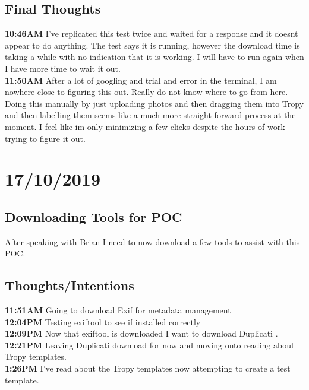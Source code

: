 \documentclass{article}
\begin{document}
\subsection{Final Thoughts}
\textbf{10:46AM} I've replicated this test twice and waited for a response and it doesnt appear to do anything. The test says it is running, however the download time is taking a while with no indication that it is working. I will have to run again when I have more time to wait it out. \\

\textbf{11:50AM} After a lot of googling and trial and error in the terminal, I am nowhere close to figuring this out. Really do not know where to go from here. Doing this manually by just uploading photos and then dragging them into Tropy and then labelling them seems like a much more straight forward process at the moment. I feel like im only minimizing a few clicks despite the hours of work trying to figure it out.

\section{17/10/2019}
\subsection{Downloading Tools for POC}
After speaking with Brian I need to now download a few tools to assist with this POC. 
\subsection{Thoughts/Intentions}
\textbf{11:51AM} Going to download Exif for metadata management \\
\textbf{12:04PM} Testing exiftool to see if installed correctly \\
\textbf{12:09PM} Now that exiftool is downloaded I want to download Duplicati . \\ 
\textbf{12:21PM} Leaving Duplicati download for now and moving onto reading about Tropy templates. \\
\textbf{1:26PM} I've read about the Tropy templates now attempting to create a test template.
\end{document}
